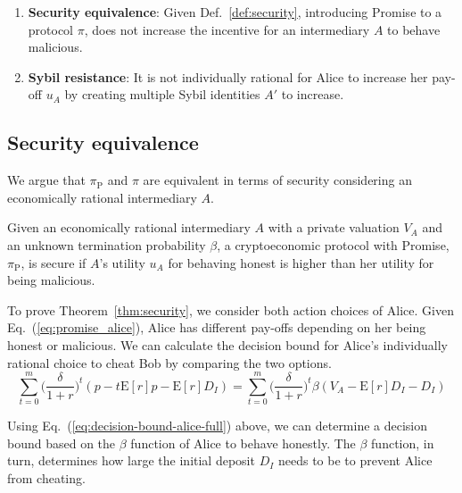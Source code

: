 \documentclass[runningheads]{llncs}
\newcommand{\sys}{Promise\xspace}
\begin{document}
\begin{enumerate}
    \item \textbf{Security equivalence}: Given Def.~\ref{def:security}, introducing \sys to a protocol $\pi$, does not increase the incentive for an intermediary $A$ to behave malicious.
    \item \textbf{Sybil resistance}: It is not individually rational for Alice to increase her pay-off $u_A$ by creating multiple Sybil identities $A'$ to increase.
\end{enumerate}



\subsection{Security equivalence}

We argue that $\pi_{\mathrm{P}}$ and $\pi$ are equivalent in terms of security considering an economically rational intermediary $A$.

\begin{theorem}
\label{thm:security}
Given an economically rational intermediary $A$ with a private valuation $V_A$ and an unknown termination probability $\beta$, a cryptoeconomic protocol with \sys, $\pi_{\mathrm{P}}$, is secure if $A$'s utility $u_A$ for behaving honest is higher than her utility for being malicious.  
\end{theorem}

To prove Theorem~\ref{thm:security}, we consider both action choices of Alice.
Given Eq.~(\ref{eq:promise_alice}), Alice has different pay-offs depending on her being honest or malicious.
We can calculate the decision bound for Alice's individually rational choice to cheat Bob by comparing the two options.
\begin{equation}
\label{eq:decision-bound-alice-full}
     \sum_{t=0}^{m} \big( \frac{\delta}{1+r} \big)^{t} ( p - t\mathrm{E}[r]p -\mathrm{E}[r]D_{I}) = 
    \sum_{t=0}^{m} \big( \frac{\delta}{1+r} \big)^{t} \beta (V_A - \mathrm{E}[r]D_{I}-D_{I})
\end{equation}

Using Eq.~(\ref{eq:decision-bound-alice-full}) above, we can determine a decision bound based on the $\beta$ function of Alice to behave honestly.
The $\beta$ function, in turn, determines how large the initial deposit $D_I$ needs to be to prevent Alice from cheating.
\end{document}
